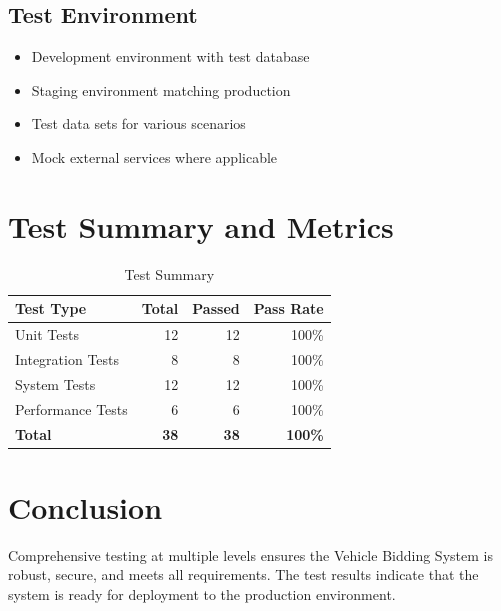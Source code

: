 \subsection{Test Environment}
\begin{itemize}
    \item Development environment with test database
    \item Staging environment matching production
    \item Test data sets for various scenarios
    \item Mock external services where applicable
\end{itemize}

\section{Test Summary and Metrics}

\begin{table}[H]
    \centering
    \begin{tabular}{|l|r|r|r|}
    \hline
    \textbf{Test Type} & \textbf{Total} & \textbf{Passed} & \textbf{Pass Rate} \\
    \hline
    Unit Tests & 12 & 12 & 100\% \\
    \hline
    Integration Tests & 8 & 8 & 100\% \\
    \hline
    System Tests & 12 & 12 & 100\% \\
    \hline
    Performance Tests & 6 & 6 & 100\% \\
    \hline
    \textbf{Total} & \textbf{38} & \textbf{38} & \textbf{100\%} \\
    \hline
    \end{tabular}
    \caption{Test Summary}
\end{table}

\section{Conclusion}

Comprehensive testing at multiple levels ensures the Vehicle Bidding System is robust, secure, and meets all requirements. The test results indicate that the system is ready for deployment to the production environment.

